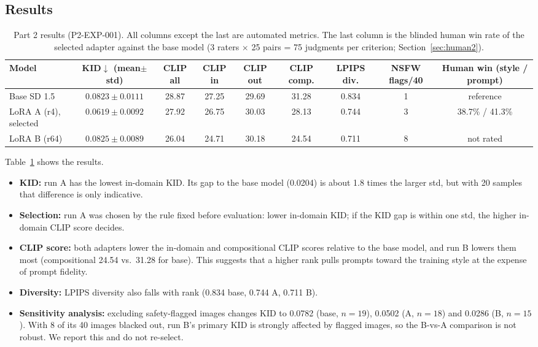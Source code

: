 \documentclass[conference]{IEEEtran}
\begin{document}
\subsection{Results}
\begin{table}[t]\centering\caption{Part 2 results (P2-EXP-001). All columns except the last are automated metrics. The last column is the blinded human win rate of the selected adapter against the base model (3 raters $\times$ 25 pairs = 75 judgments per criterion; Section~\ref{sec:human2}).}\label{tab:p2}
\begin{tabular}{lcccccccc}\toprule
Model & KID$\downarrow$ (mean$\pm$std) & CLIP all & CLIP in & CLIP out & CLIP comp. & LPIPS div. & NSFW flags/40 & Human win (style / prompt)\\\midrule
Base SD 1.5 & $0.0823\pm0.0111$ & 28.87 & 27.25 & 29.69 & 31.28 & 0.834 & 1 & reference\\
LoRA A (r4), selected & $\mathbf{0.0619\pm0.0092}$ & 27.92 & 26.75 & 30.03 & 28.13 & 0.744 & 3 & 38.7\% / 41.3\%\\
LoRA B (r64) & $0.0825\pm0.0089$ & 26.04 & 24.71 & 30.18 & 24.54 & 0.711 & 8 & not rated\\\bottomrule
\end{tabular}\end{table}

Table~\ref{tab:p2} shows the results.
\begin{itemize}
\item \textbf{KID:} run A has the lowest in-domain KID. Its gap to the base model (0.0204) is about 1.8 times the larger std, but with 20 samples that difference is only indicative.
\item \textbf{Selection:} run A was chosen by the rule fixed before evaluation: lower in-domain KID; if the KID gap is within one std, the higher in-domain CLIP score decides.
\item \textbf{CLIP score:} both adapters lower the in-domain and compositional CLIP scores relative to the base model, and run B lowers them most (compositional 24.54 vs.\ 31.28 for base). This suggests that a higher rank pulls prompts toward the training style at the expense of prompt fidelity.
\item \textbf{Diversity:} LPIPS diversity also falls with rank (0.834 base, 0.744 A, 0.711 B).
\item \textbf{Sensitivity analysis:} excluding safety-flagged images changes KID to 0.0782 (base, $n{=}19$), 0.0502 (A, $n{=}18$) and 0.0286 (B, $n{=}15$). With 8 of its 40 images blacked out, run B's primary KID is strongly affected by flagged images, so the B-vs-A comparison is not robust. We report this and do not re-select.
\end{itemize}
\end{document}

